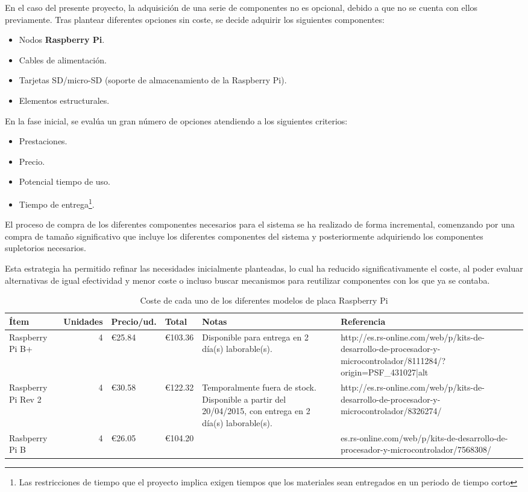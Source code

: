 En el caso del presente proyecto, la adquisición de una serie de componentes no es opcional, debido a que no se cuenta con ellos previamente. Tras plantear diferentes opciones sin coste, se decide adquirir los siguientes componentes:

\begin{itemize}
  \item Nodos \textbf{Raspberry Pi}.
  \item Cables de alimentación.
  \item Tarjetas SD/micro-SD (soporte de almacenamiento de la Raspberry Pi).
  \item Elementos estructurales.
\end{itemize}

En la fase inicial, se evalúa un gran número de opciones atendiendo a los siguientes criterios:

\begin{itemize}
  \item Prestaciones.
  \item Precio.
  \item Potencial tiempo de uso.
  \item Tiempo de entrega\footnote{Las restricciones de tiempo que el proyecto implica exigen tiempos que los materiales sean entregados en un periodo de tiempo corto}.
\end{itemize}

\citationneeded[TODO]
El proceso de compra de los diferentes componentes necesarios para el sistema se ha realizado de forma incremental, comenzando por una compra de tamaño significativo que incluye los diferentes componentes del sistema y posteriormente adquiriendo los componentes supletorios necesarios.

Esta estrategia ha permitido refinar las necesidades inicialmente planteadas, lo cual ha reducido significativamente el coste, al poder evaluar alternativas de igual efectividad y menor coste o incluso buscar mecanismos para reutilizar componentes con los que ya se contaba.

\begin{landscape}
\begin{table}
\begin{tabular}{|l|r|l|l|p{4.5cm}|p{5cm}|}
\hline
Ítem&Unidades&Precio/ud.&Total&Notas&Referencia\\
\hline
Raspberry Pi B+&4&€25.84&€103.36&Disponible para entrega en 2 día(s) laborable(s).&http://es.rs-online.com/web/p/kits-de-desarrollo-de-procesador-y-microcontrolador/8111284/?origin=PSF\_431027|alt\\
\hline
Raspberry Pi Rev 2&4&€30.58&€122.32&Temporalmente fuera de stock. Disponible a partir del 20/04/2015, con entrega en 2 día(s) laborable(s).&http://es.rs-online.com/web/p/kits-de-desarrollo-de-procesador-y-microcontrolador/8326274/\\
\hline
Rasbperry Pi B&4&€26.05&€104.20&&es.rs-online.com/web/p/kits-de-desarrollo-de-procesador-y-microcontrolador/7568308/\\
\hline
\end{tabular}
\caption{Coste de cada uno de los diferentes modelos de placa Raspberry Pi}
\end{table}
\end{landscape}

